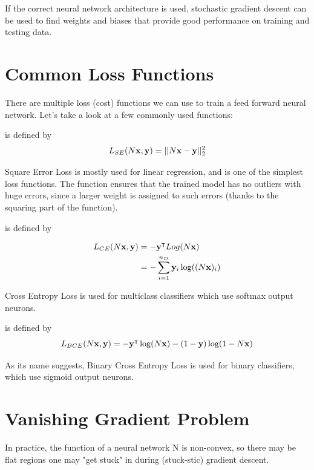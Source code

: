 If the correct neural network architecture is used, stochastic gradient descent can be used to find weights and biases that provide good performance on training and testing data.

\section{Common Loss Functions}

There are multiple loss (cost) functions we can use to train a feed forward neural network. Let's take a look at a few commonly used functions:

\smallskip
\begin{definition}
     is defined by
    $$
    L_{SE}(N\vx,\vy) = ||N\vx-\vy||_{2}^{2}
    $$
\end{definition}
Square Error Loss is mostly used for linear regression, and is one of the simplest loss functions. The function ensures that the trained model has no outliers with huge errors, since a larger weight is assigned to such errors (thanks to the squaring part of the function).

\medskip
\begin{definition}
     is defined by
    \begin{ceqn}
    \begin{align*}
        L_{CE}(N\vx,\vy) &= -\vy^\intercal Log(N\vx) \\
        &= -\sum_{i=1}^{n_D}{\vy_i\log((N\vx)_i)}
    \end{align*}
    \end{ceqn}
\end{definition}
Cross Entropy Loss is used for multiclass classifiers which use softmax output neurons.

\medskip
\begin{definition}
     is defined by
    $$
    L_{BCE}(N\vx,\vy) = -\vy^\intercal\log(N\vx) - (1-\vy)\log(1-N\vx)
    $$
\end{definition}
As its name suggests, Binary Cross Entropy Loss is used for binary classifiers, which use sigmoid output neurons.


\section{Vanishing Gradient Problem}
In practice, the function of a neural network N is non-convex, so there may be flat regions one may "get stuck" in during (stuck-stic) gradient descent.

